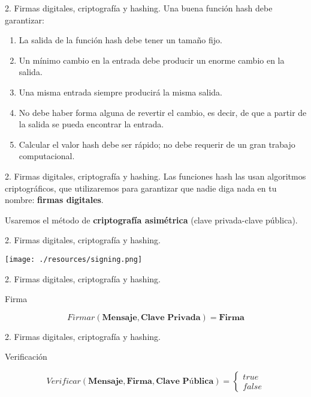 \documentclass[10pt, xcolor=table]{beamer}
\begin{document}
\begin{frame}{2. Firmas digitales, criptografía y hashing. }
Una buena función hash debe garantizar:

\begin{enumerate}
\item
	La salida de la función hash debe tener un tamaño fijo.
\item
	Un mínimo cambio en la entrada debe producir un enorme cambio en la salida.
\item
	Una misma entrada siempre producirá la misma salida.
\item
	No debe haber forma alguna de revertir el cambio, es decir, de que a partir de la salida se pueda encontrar la entrada.
\item
	Calcular el valor hash debe ser rápido; no debe requerir de un gran trabajo computacional.
\end{enumerate}
\end{frame}


\begin{frame}{2. Firmas digitales, criptografía y hashing. }
Las funciones hash las usan algoritmos criptográficos, que utilizaremos para garantizar que nadie diga nada en tu nombre: \textbf{firmas digitales}.

Usaremos el método de \textbf{criptografía asimétrica} (clave privada-clave pública).
\end{frame}


\begin{frame}{2. Firmas digitales, criptografía y hashing. }
\begin{center}
	\texttt{[image: ./resources/signing.png]}
\end{center}
\end{frame}

\begin{frame}{2. Firmas digitales, criptografía y hashing. }
\begin{center}
	\large Firma
\end{center}
$$
Firmar(\textbf{Mensaje}, \textbf{Clave Privada}) = \textbf{Firma}
$$
\end{frame}

\begin{frame}{2. Firmas digitales, criptografía y hashing. }
\begin{center}
	\large Verificación
\end{center}
$$
Verificar(\textbf{Mensaje}, \textbf{Firma}, \textbf{Clave Pública}) = \begin{cases} true \\ false \end{cases}
$$
\end{frame}
\end{document}
